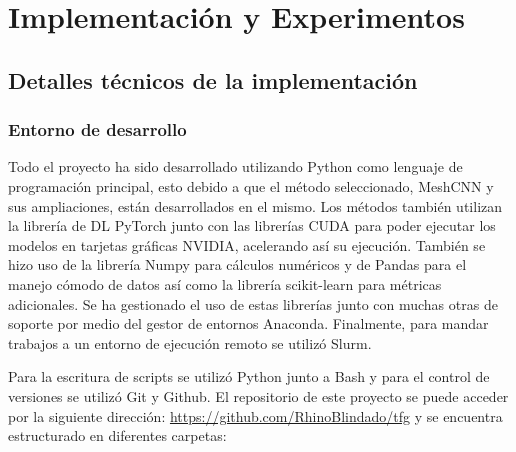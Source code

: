 \chapter{Implementación y Experimentos}
\section{Detalles técnicos de la implementación}
\label{section:tech_details}
\subsection{Entorno de desarrollo}
Todo el proyecto ha sido desarrollado utilizando Python como lenguaje de programación principal, esto debido a que el método seleccionado, MeshCNN y sus ampliaciones, están desarrollados en el mismo. Los métodos también utilizan la librería de DL PyTorch junto con las librerías CUDA para poder ejecutar los modelos en tarjetas gráficas NVIDIA, acelerando así su ejecución. También se hizo uso de la librería Numpy para cálculos numéricos y de Pandas para el manejo cómodo de datos así como la librería scikit-learn para métricas adicionales. Se ha gestionado el uso de estas librerías junto con muchas otras de soporte por medio del gestor de entornos Anaconda. Finalmente, para mandar trabajos a un entorno de ejecución remoto se utilizó Slurm.

Para la escritura de scripts se utilizó Python junto a Bash y para el control de versiones se utilizó Git y Github. El repositorio de este proyecto se puede acceder por la siguiente dirección: \url{https://github.com/RhinoBlindado/tfg} y se encuentra estructurado en diferentes carpetas:

